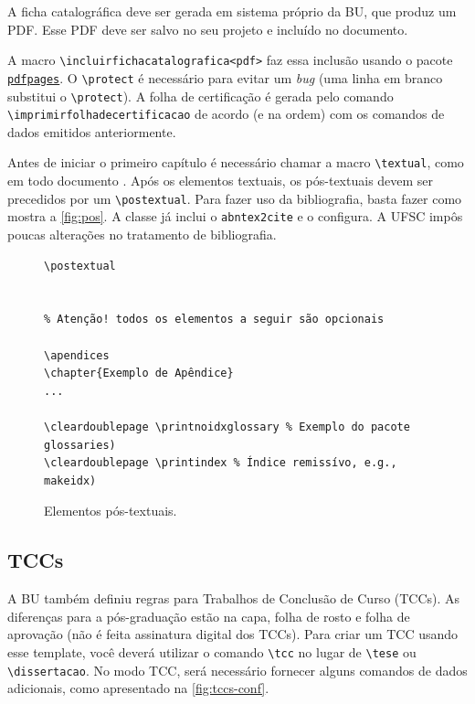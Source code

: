 \documentclass[embeddedlogo]{ufsc-thesis-rn46-2019}
\newcommand{\lacmd}[1]{\texttt{\textbackslash{}#1}}
\begin{document}
A ficha catalográfica deve ser gerada em sistema próprio da BU, que produz um
PDF. Esse PDF deve ser salvo no seu projeto e incluído no documento.

A macro \lacmd{incluirfichacatalografica{<pdf>}} faz essa inclusão usando o
pacote \href{https://www.ctan.org/pkg/pdfpages}{\texttt{pdfpages}}. O
\lacmd{protect} é necessário para evitar um \emph{bug} (uma linha em branco
substitui o \lacmd{protect}).  A folha de certificação é gerada pelo comando
\lacmd{imprimirfolhadecertificacao} de acordo (e na ordem) com os comandos de
dados emitidos anteriormente.

Antes de iniciar o primeiro capítulo é necessário chamar a macro
\lacmd{textual}, como em todo documento \abnTeX. Após os elementos textuais, os
pós-textuais devem ser precedidos por um \lacmd{postextual}. Para fazer uso da
bibliografia, basta fazer como mostra a \autoref{fig:pos}. A classe já inclui o
\texttt{abntex2cite} e o configura. A UFSC impôs poucas alterações no tratamento
de bibliografia.

\begin{figure}[tb]
  \centering
  \caption{Elementos pós-textuais.}
  \label{fig:pos}
  \begin{verbatim}
\postextual


% Atenção! todos os elementos a seguir são opcionais

\apendices
\chapter{Exemplo de Apêndice}
...

\cleardoublepage \printnoidxglossary % Exemplo do pacote glossaries)
\cleardoublepage \printindex % Índice remissívo, e.g., makeidx)
  \end{verbatim}
\end{figure}

\subsection{TCCs}
\label{sec:tcc}

A BU também definiu regras para Trabalhos de Conclusão de Curso (TCCs). As
diferenças para a pós-graduação estão na capa, folha de rosto e folha de
aprovação (não é feita assinatura digital dos TCCs). Para criar um TCC usando
esse template, você deverá utilizar o comando \lacmd{tcc} no lugar de
\lacmd{tese} ou \lacmd{dissertacao}. No modo TCC, será necessário fornecer
alguns comandos de dados adicionais, como apresentado na
\autoref{fig:tccs-conf}.
\end{document}
